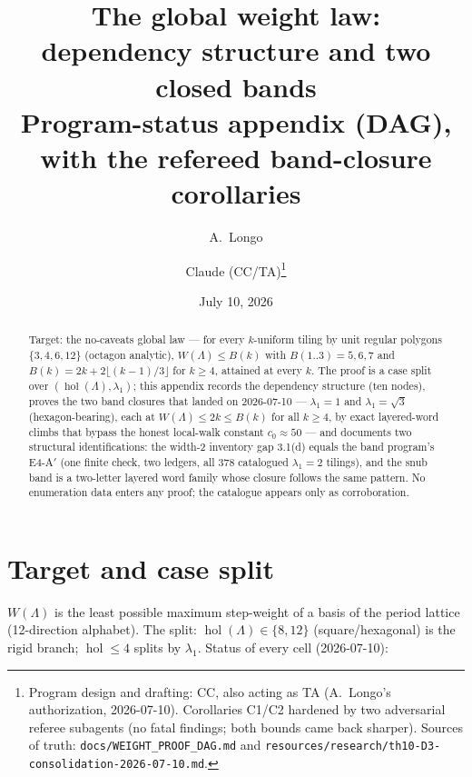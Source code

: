 \documentclass[11pt,a4paper,oneside]{article}
\title{The global weight law:\\ dependency structure and two closed bands\\[1ex]
\large Program-status appendix (DAG), with the refereed band-closure corollaries}
\author{A.~Longo \and Claude (CC/TA)\thanks{Program design and drafting: CC, also acting
as TA (A.~Longo's authorization, 2026-07-10). Corollaries C1/C2 hardened by two adversarial
referee subagents (no fatal findings; both bounds came back sharper). Sources of truth:
\texttt{docs/WEIGHT\_PROOF\_DAG.md} and
\texttt{resources/research/th10-D3-consolidation-2026-07-10.md}.}}
\date{July 10, 2026}
\theoremstyle{plain}
\theoremstyle{remark}
\DeclareMathOperator{\hol}{hol}
\newcommand{\Bk}{B(k)}
\begin{document}
\maketitle

\begin{abstract}
\noindent Target: the no-caveats global law --- for every $k$-uniform tiling by unit
regular polygons $\{3,4,6,12\}$ (octagon analytic), $W(\Lambda) \le \Bk$ with
$B(1..3) = 5, 6, 7$ and $\Bk = 2k + 2\lfloor(k{-}1)/3\rfloor$ for $k \ge 4$, attained at
every $k$. The proof is a case split over $(\hol(\Lambda), \lambda_1)$; this appendix
records the dependency structure (ten nodes), proves the two band closures that landed
on 2026-07-10 --- $\lambda_1 = 1$ and $\lambda_1 = \sqrt3$ (hexagon-bearing), each at
$W(\Lambda) \le 2k \le \Bk$ for all $k \ge 4$, by exact layered-word climbs that bypass
the honest local-walk constant $c_0 \approx 50$ --- and documents two structural
identifications: the width-2 inventory gap 3.1(d) equals the band program's E4-A$'$
(one finite check, two ledgers, all $378$ catalogued $\lambda_1 = 2$ tilings), and the
snub band is a two-letter layered word family whose closure follows the same pattern.
No enumeration data enters any proof; the catalogue appears only as corroboration.
\end{abstract}

\section{Target and case split}\label{sec:target}

$W(\Lambda)$ is the least possible maximum step-weight of a basis of the period lattice
(12-direction alphabet). The split: $\hol(\Lambda) \in \{8, 12\}$ (square/hexagonal) is the
rigid branch; $\hol \le 4$ splits by $\lambda_1$. Status of every cell (2026-07-10):
\end{document}
